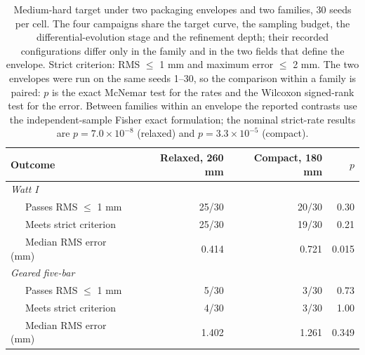 \begin{table}[H]
\caption{Medium-hard target under two packaging envelopes and two families, 30 seeds per cell. The four campaigns share the target curve, the sampling budget, the differential-evolution stage and the refinement depth; their recorded configurations differ only in the family and in the two fields that define the envelope. Strict criterion: RMS $\leq$ 1 mm and maximum error $\leq$ 2 mm. The two envelopes were run on the same seeds 1--30, so the comparison within a family is paired: $p$ is the exact McNemar test for the rates and the Wilcoxon signed-rank test for the error. Between families within an envelope the reported contrasts use the independent-sample Fisher exact formulation; the nominal strict-rate results are $p=7.0\times 10^{-8}$ (relaxed) and $p=3.3\times 10^{-5}$ (compact).}
\label{tab:packaging_effect}
\centering
\small
\begin{tabular}{lrrr}
\hline
Outcome & Relaxed, 260 mm & Compact, 180 mm & $p$ \\
\hline
\textit{Watt I} & & & \\
~~~Passes RMS $\leq$ 1 mm & 25/30 & 20/30 & 0.30 \\
~~~Meets strict criterion & 25/30 & 19/30 & 0.21 \\
~~~Median RMS error (mm) & 0.414 & 0.721 & 0.015 \\
\textit{Geared five-bar} & & & \\
~~~Passes RMS $\leq$ 1 mm & 5/30 & 3/30 & 0.73 \\
~~~Meets strict criterion & 4/30 & 3/30 & 1.00 \\
~~~Median RMS error (mm) & 1.402 & 1.261 & 0.349 \\
\hline
\end{tabular}
\end{table}
